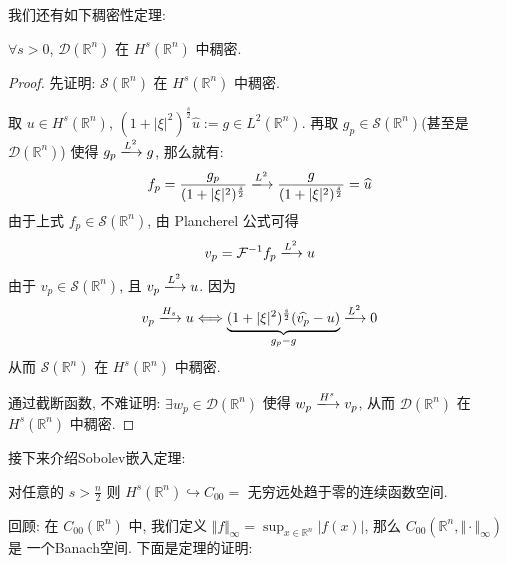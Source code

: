 \documentclass[11pt]{ctexart}[UTF8]
\begin{document}
我们还有如下稠密性定理:
\begin{theorem}
    $\forall s>0$, $\mathscr{D}(\mathbb{R}^n)$ 在 $H^s(\mathbb{R}^n)$ 中稠密.
\end{theorem}
\begin{proof}
    先证明: $\mathscr{S}(\mathbb{R}^n)$ 在 $H^s(\mathbb{R}^n)$ 中稠密.\par
    取 $u \in H^s(\mathbb{R}^n)$, $(1+|\xi|^2)^{\frac{s}{2}}\widehat{u} := g \in L^2(\mathbb{R}^n)$. 再取 $g_{p} \in \mathscr{S}(\mathbb{R}^n)$(甚至是 $\mathscr{D}(\mathbb{R}^n)$) 
    使得 $g_{p} \xlongrightarrow{L^{2}}g$, 那么就有:
    \begin{equation*}
        f_{p} = \frac{g_{p}}{(1+|\xi|^{2})^{\frac{s}{2}}} \xlongrightarrow{L^{2}} \frac{g}{(1+|\xi|^{2})^{\frac{s}{2}}} = \widehat{u}
    \end{equation*}
    由于上式 $f_{p}\in \mathscr{S}(\mathbb{R}^n)$, 由 Plancherel 公式可得 
    \begin{equation*}
        v_{p} = \mathcal{F}^{-1}f_{p} \xlongrightarrow{L^2} u
    \end{equation*}
    由于 $v_{p} \in \mathscr{S}(\mathbb{R}^n)$, 且 $v_{p} \xlongrightarrow{L^2}u$.
    因为
    \begin{equation*}
        v_{p} \xlongrightarrow{H_{s}} u \Longleftrightarrow \underbrace{(1+|\xi|^2)^{\frac{s}{2}}(\widehat{v_{p}}-u)}_{g_{p}-g} \xlongrightarrow{L^2} 0
    \end{equation*}
    从而 $\mathscr{S}(\mathbb{R}^n)$ 在 $H^s(\mathbb{R}^n)$ 中稠密.\par
    通过截断函数, 不难证明: $\exists w_{p}\in \mathscr{D}(\mathbb{R}^n)$ 使得 $w_{p} \xlongrightarrow{H^s} v_{p}$, 从而 $\mathscr{D}(\mathbb{R}^n)$ 在 $H^s(\mathbb{R}^n)$ 中稠密.
\end{proof}
接下来介绍Sobolev嵌入定理:
\begin{theorem}
    对任意的 $s > \frac{n}{2}$ 则 $H^{s}(\mathbb{R}^n) \hookrightarrow C_{00}=$ 无穷远处趋于零的连续函数空间.
\end{theorem}
回顾: 在 $C_{00}(\mathbb{R}^n)$ 中, 我们定义 $\Vert f \Vert_{\infty} = \sup_{x \in \mathbb{R}^n} |f(x)|$, 那么 $C_{00}(\mathbb{R}^{n}, \Vert \cdot \Vert_{\infty})$ 是
一个Banach空间. 下面是定理的证明:
\end{document}
